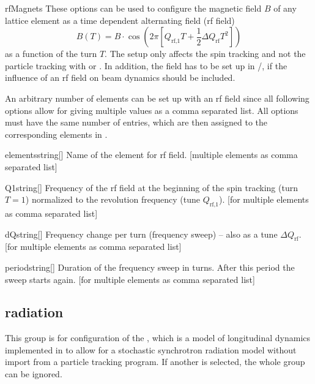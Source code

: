\documentclass[a4paper]{scrartcl}
\begin{document}
\begin{configdocgroup}{rfMagnets}
  These options can be used to configure the magnetic field $B$ of any lattice element as a
  time dependent alternating field (rf field)
  \begin{equation*}
    B(T) = B \cdot \cos\left( 2\pi \left[ Q_\text{rf,1}T + \frac{1}{2}\Delta
        Q_\text{rf} T^2 \right] \right)
  \end{equation*}
  as a function of the turn $T$.
  The setup only affects the spin tracking and not the particle tracking with \ele or
  \madx. In addition, the field has to be set up in \ele/\madx, if the influence of an rf
  field on beam dynamics should be included.

  An arbitrary number of elements can be set up with an rf field since all
  following options allow for giving multiple values as a comma separated list. All
  options must have the same number of entries, which are then assigned to the
  corresponding elements in .\\[1mm]

  \begin{configdoc}{elements}{string}{}[]
    Name of the element for rf field. [multiple elements as comma separated list]
  \end{configdoc}

  \begin{configdoc}{Q1}{string}{}[]
    Frequency of the rf field at the beginning of the spin tracking (turn $T=1$) normalized to
    the revolution frequency (tune $Q_\text{rf,1}$). [for multiple elements as comma separated list]
  \end{configdoc}

  \begin{configdoc}{dQ}{string}{}[]
    Frequency change per turn (frequency sweep) -- also as a tune $\Delta Q_\text{rf}$.
    [for multiple elements as comma separated list]
  \end{configdoc}

  \begin{configdoc}{period}{string}{}[]
    Duration of the frequency sweep in turns. After this period the sweep starts again.
    [for multiple elements as comma separated list]
  \end{configdoc}
\end{configdocgroup}



\subsection{radiation}
\label{sec:config-rad}
This group is for configuration of the  ,
which is a model of longitudinal dynamics implemented in \polem to allow for a stochastic
synchrotron radiation model without import from a particle tracking program. If another
 is selected, the whole group can be ignored.
\end{document}
